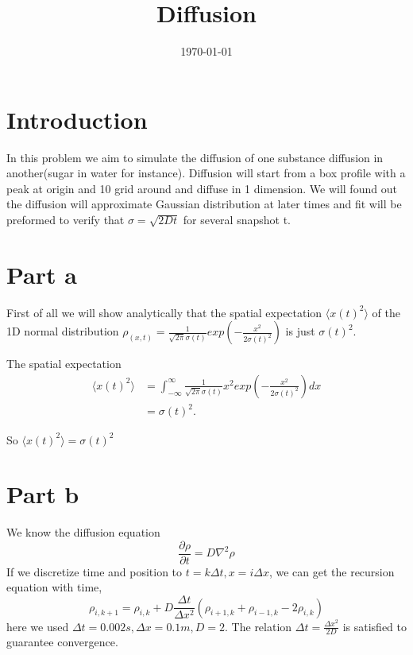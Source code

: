 \documentclass{article}
\title{Diffusion}
\date{\today}
\begin{document}
\maketitle
\section{Introduction}
\quad In this problem we aim to simulate the diffusion of one substance diffusion in another(sugar in water for instance). Diffusion will start from a box profile with a peak at origin and 10 grid around and diffuse in 1 dimension. We will found out the diffusion will approximate Gaussian distribution at later times and fit will be preformed to verify that $\sigma=\sqrt{2Dt}$ for several snapshot t.

\section{Part a}
\quad First of all we will show analytically that the spatial expectation $\langle x(t)^2\rangle$ of the 1D normal distribution $\rho_{(x,t)}=\frac{1}{\sqrt{2\pi}\sigma{(t)}}exp(-\frac{x^2}{2\sigma{(t)}^2})$ is just $\sigma(t)^2$.

The spatial expectation
\begin{equation}
\begin{split}
\langle x(t)^2\rangle&=\int_{-\infty}^{\infty}\frac{1}{\sqrt{2\pi}\sigma(t)}x^2exp(-\frac{x^2}{2\sigma(t)^2})dx\\
&=\sigma(t)^2.
\end{split}
\end{equation}

So $\langle x(t)^2\rangle=\sigma(t)^2$
\section{Part b}
\quad We know the diffusion equation
\begin{equation}
\frac{\partial\rho}{\partial t}=D\nabla^2\rho
\end{equation}
If we discretize time and position to $t=k\Delta t, x=i\Delta x$, we can get the recursion equation with time, 
\begin{equation}
\rho_{i,k+1}=\rho_{i,k}+D\frac{\Delta t}{\Delta x^2}(\rho_{i+1,k}+\rho_{i-1,k}-2\rho_{i,k})
\end{equation}
here we used $\Delta t=0.002s, \Delta x=0.1m, D=2$. The relation $\Delta t=\frac{\Delta x^2}{2D}$ is satisfied to guarantee convergence.
\end{document}

